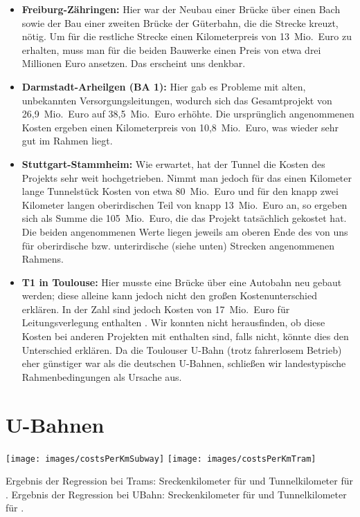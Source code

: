 \begin{itemize}

    \item \textbf{Freiburg-Zähringen:} Hier war der Neubau einer Brücke über einen Bach sowie der Bau einer zweiten Brücke der Güterbahn, die die Strecke kreuzt, nötig. Um für die restliche Strecke einen Kilometerpreis von 13{\ }Mio.{\ }Euro zu erhalten, muss man für die beiden Bauwerke einen Preis von etwa drei Millionen Euro ansetzen. Das erscheint uns denkbar.
    \item \textbf{Darmstadt-Arheilgen (BA 1):} Hier gab es Probleme mit alten, unbekannten Versorgungsleitungen, wodurch sich das Gesamtprojekt von 26,9{\ }Mio.{\ }Euro auf 38,5{\ }Mio.{\ }Euro erhöhte. Die ursprünglich angenommenen Kosten ergeben einen Kilometerpreis von 10,8{\ }Mio.{\ }Euro, was wieder sehr gut im Rahmen liegt.
    \item \textbf{Stuttgart-Stammheim:} Wie erwartet, hat der Tunnel die Kosten des Projekts sehr weit hochgetrieben. Nimmt man jedoch für das einen Kilometer lange Tunnelstück Kosten von etwa 80{\ }Mio.{\ }Euro und für den knapp zwei Kilometer langen oberirdischen Teil von knapp 13{\ }Mio.{\ }Euro an, so ergeben sich als Summe die 105{\ }Mio.{\ }Euro, die das Projekt tatsächlich gekostet hat. Die beiden angenommenen Werte liegen jeweils am oberen Ende des von uns für oberirdische bzw. unterirdische (siehe unten) Strecken angenommenen Rahmens.
    \item \textbf{T1 in Toulouse:} Hier musste eine Brücke über eine Autobahn neu gebaut werden; diese alleine kann jedoch nicht den großen Kostenunterschied erklären. In der Zahl sind jedoch Kosten von 17{\ }Mio.{\ }Euro für Leitungsverlegung enthalten \cite{tlsesv}. Wir konnten nicht herausfinden, ob diese Kosten bei anderen Projekten mit enthalten sind, falls nicht, könnte dies den Unterschied erklären. Da die Toulouser U-Bahn (trotz fahrerlosem Betrieb) eher günstiger war als die deutschen U-Bahnen, schließen wir landestypische Rahmenbedingungen als Ursache aus.

\end{itemize}

\section{U-Bahnen}








\texttt{[image: images/costsPerKmSubway]}
\texttt{[image: images/costsPerKmTram]}

Ergebnis der Regression bei Trams: Sreckenkilometer für \tramnormal und Tunnelkilometer für \tramtunnel.
Ergebnis der Regression bei UBahn: Sreckenkilometer für \subwaynormal und Tunnelkilometer für \subwaytunnel.

